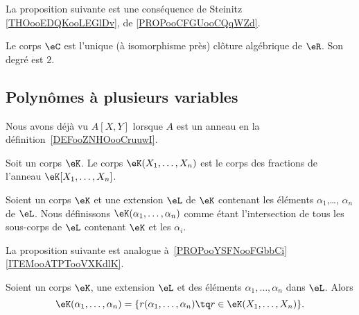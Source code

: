 La proposition suivante est une conséquence de Steinitz \ref{THOooEDQKooLEGlDv}, de \ref{PROPooCFGUooCQqWZd}.
\begin{proposition}	\label{PROPooZWVPooStuTAO}
	Le corps \( \eC\) est l'unique (à isomorphisme près) clôture algébrique de \( \eR\). Son degré est \( 2\).
\end{proposition}


\subsection{Polynômes à plusieurs variables}

Nous avons déjà vu \( A[X,Y]\) lorsque \( A\) est un anneau en la définition~\ref{DEFooZNHOooCruuwI}.

\begin{definition}      \label{DEFooRHRKooPqLNOp}
	Soit un corps \( \eK\). Le corps \( \eK(X_1,\ldots, X_n)\) est le corps des fractions de l'anneau \( \eK[X_1,\ldots, X_n]\).
\end{definition}

\begin{definition}  \label{DEFooOCPHooXneutp}
	Soient un corps \( \eK\) et une extension \( \eL\) de \( \eK\) contenant les éléments \( \alpha_1\),\ldots, \( \alpha_n\) de \( \eL\). Nous définissons \( \eK(\alpha_1,\ldots, \alpha_n)\) comme étant l'intersection de tous les sous-corps de \( \eL\) contenant \( \eK\) et les \( \alpha_i\).
\end{definition}

La proposition suivante est analogue à~\ref{PROPooYSFNooFGbbCi}\ref{ITEMooATPTooVXKdlK}.

\begin{lemma}        \label{LEMooQEJHooAmSNxU}
	Soient un corps \( \eK\), une extension \( \eL\) et des éléments \( \alpha_1,\ldots, \alpha_n\) dans \( \eL\). Alors
	\begin{equation}
		\eK(\alpha_1,\ldots, \alpha_n)=\{ r(\alpha_1,\ldots, \alpha_n)\tq r\in \eK(X_1,\ldots, X_n) \}.
	\end{equation}
\end{lemma}

